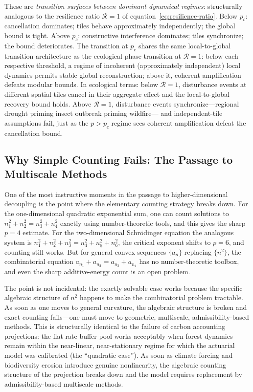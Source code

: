 \documentclass[12pt]{article}
\begin{document}
These are \emph{transition surfaces between dominant dynamical regimes}: structurally
analogous to the resilience ratio $\mathcal{R}=1$ of equation~\eqref{eq:resilience-ratio}.
Below $p_c$: cancellation dominates; tiles behave approximately independently; the global
bound is tight. Above $p_c$: constructive interference dominates; tiles synchronize; the
bound deteriorates. The transition at $p_c$ shares the same local-to-global transition
architecture as the ecological phase transition at $\mathcal{R}=1$: below each respective
threshold, a regime of incoherent (approximately independent) local dynamics permits stable
global reconstruction; above it, coherent amplification defeats modular bounds. In ecological
terms: below $\mathcal{R}=1$, disturbance events at different spatial tiles cancel in their
aggregate effect and the local-to-global recovery bound holds. Above $\mathcal{R}=1$,
disturbance events synchronize---regional drought priming insect outbreak priming wildfire---
and independent-tile assumptions fail, just as the $p>p_c$ regime sees coherent
amplification defeat the cancellation bound.

\subsection{Why Simple Counting Fails: The Passage to Multiscale Methods}

One of the most instructive moments in the passage to higher-dimensional decoupling is
the point where the elementary counting strategy breaks down. For the one-dimensional
quadratic exponential sum, one can count solutions to $n_1^2+n_2^2 = n_3^2+n_4^2$
exactly using number-theoretic tools, and this gives the sharp $p=4$ estimate. For the
two-dimensional Schr\"odinger equation the analogous system is $n_1^2+n_2^2+n_3^2 =
n_4^2+n_5^2+n_6^2$, the critical exponent shifts to $p=6$, and counting still works.
But for general convex sequences $\{a_n\}$ replacing $\{n^2\}$, the combinatorial
equation $a_{n_1}+a_{n_2}=a_{n_3}+a_{n_4}$ has no number-theoretic toolbox, and
even the sharp additive-energy count is an open problem.

The point is not incidental: the exactly solvable case works because the specific
algebraic structure of $n^2$ happens to make the combinatorial problem tractable. As
soon as one moves to general curvature, the algebraic structure is broken and exact
counting fails---one must move to geometric, multiscale, admissibility-based methods.
This is structurally identical to the failure of carbon accounting projections: the
flat-rate buffer pool works acceptably when forest dynamics remain within the
near-linear, near-stationary regime for which the actuarial model was calibrated
(the ``quadratic case''). As soon as climate forcing and biodiversity erosion introduce
genuine nonlinearity, the algebraic counting structure of the projection breaks down
and the model requires replacement by admissibility-based multiscale methods.
\end{document}
